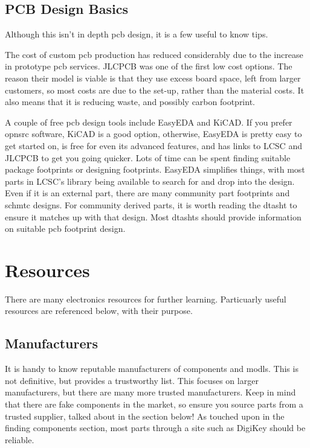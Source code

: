 \documentclass[a4paper,11pt]{report}
\begin{document}
\vspace*{1\baselineskip}

\subsection{PCB Design Basics}

Although this isn't in depth \gls{pcb} design, it is a few useful to know tips.

The cost of custom \gls{pcb} production has reduced considerably due to the increase in prototype \gls{pcb} services. JLCPCB was one of the first low cost options. The reason their model is viable is that they use excess board space, left from larger customers, so most costs are due to the set-up, rather than the material costs. It also means that it is reducing waste, and possibly carbon footprint.

A couple of free \gls{pcb} design tools include EasyEDA and KiCAD. If you prefer \gls{opnsrc} software, KiCAD is a good option, otherwise, EasyEDA is pretty easy to get started on, is free for even its advanced features, and has links to LCSC and JLCPCB to get you going quicker. Lots of time can be spent finding suitable package footprints or designing footprints. EasyEDA simplifies things, with most parts in LCSC's library being available to search for and drop into the design. Even if it is an external part, there are many community part footprints and \gls{schmtc} designs. For community derived parts, it is worth reading the \gls{dtasht} to ensure it matches up with that design. Most \gls{dtasht}s should provide information on suitable \gls{pcb} footprint design.

\pagebreak

\section{Resources}

There are many electronics resources for further learning. Particuarly useful resources are referenced below, with their purpose.

\vspace*{1\baselineskip}

\subsection{Manufacturers}

It is handy to know reputable manufacturers of components and \gls{modl}s. This is not definitive, but provides a trustworthy list. This focuses on larger manufacturers, but there are many more trusted manufacturers. Keep in mind that there are fake components in the market, so ensure you source parts from a trusted supplier, talked about in the section below! As touched upon in the finding components section, most parts through a site such as DigiKey should be reliable.
\end{document}
